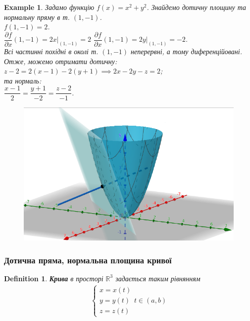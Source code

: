 \documentclass[a4paper, 10pt]{article}
\def\departial#1#2{\dfrac{\partial {#1}}{\partial {#2}}}
\theoremstyle{theoremdd}
\theoremstyle{theoremdd}
\theoremstyle{theoremdd}
\newtheorem{definition}[theorem]{Definition}
\theoremstyle{theoremdd}
\theoremstyle{theoremdd}
\newtheorem{example}[theorem]{Example}
\theoremstyle{theoremdd}
\theoremstyle{theoremdd}
\theoremstyle{theoremdd}
\theoremstyle{theoremdd}
\begin{document}
\begin{example}
Задамо функцію $f(x) = x^2+y^2$. Знайдемо дотичну площину та нормальну пряму в т. $(1,-1)$.\\
$f(1,-1) = 2$.\\
$\departial{f}{x}(1,-1) = 2x \Big|_{(1,-1)} = 2$ \hspace{1cm} $\departial{f}{x}(1,-1) = 2y \Big|_{(1,-1)} = -2$.\\
Всі частинні похідні в околі т. $(1,-1)$ неперервні, а тому диференційовані. Отже, можемо отримати дотичну:\\
$z - 2 = 2(x-1) -2(y+1) \implies 2x-2y-z=2$;\\
та нормаль:\\
$\dfrac{x-1}{2} = \dfrac{y+1}{-2} = \dfrac{z-2}{-1}$.
\begin{figure}[H]
\centering
\includegraphics[scale=0.4]{tangent_plane.png}
\end{figure}
\end{example}

\subsubsection{Дотична пряма, нормальна площина кривої}
\begin{definition}
\textbf{Крива} в просторі $\mathbb{R}^3$ задається таким рівнянням
\begin{align*}
\begin{cases} x = x(t) \\ y = y(t) \\ z = z(t) \end{cases} t \in (a,b)
\end{align*}
\end{definition}
\end{document}
